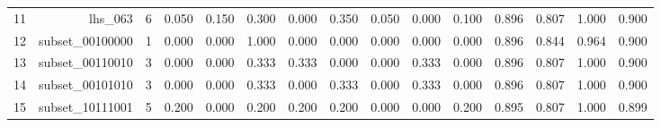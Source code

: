 \begin{landscape}
\begin{table}[htbp]
{\begin{tabular}{lrrrrrrrrrrrrrr}
11 & lhs\_\allowbreak{}063 & 6 & 0.050 & 0.150 & 0.300 & 0.000 & 0.350 & 0.050 & 0.000 & 0.100 & 0.896 & 0.807 & 1.000 & 0.900 \\
12 & subset\_\allowbreak{}00100000 & 1 & 0.000 & 0.000 & 1.000 & 0.000 & 0.000 & 0.000 & 0.000 & 0.000 & 0.896 & 0.844 & 0.964 & 0.900 \\
13 & subset\_\allowbreak{}00110010 & 3 & 0.000 & 0.000 & 0.333 & 0.333 & 0.000 & 0.000 & 0.333 & 0.000 & 0.896 & 0.807 & 1.000 & 0.900 \\
14 & subset\_\allowbreak{}00101010 & 3 & 0.000 & 0.000 & 0.333 & 0.000 & 0.333 & 0.000 & 0.333 & 0.000 & 0.896 & 0.807 & 1.000 & 0.900 \\
15 & subset\_\allowbreak{}10111001 & 5 & 0.200 & 0.000 & 0.200 & 0.200 & 0.200 & 0.000 & 0.000 & 0.200 & 0.895 & 0.807 & 1.000 & 0.899 \\
\bottomrule
\end{tabular}
}
\end{table}
\end{landscape}
